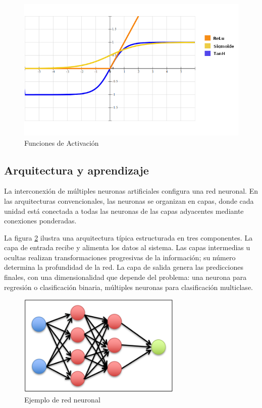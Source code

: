 \begin{figure}[h!]
    \centering
    \includegraphics[width=1\textwidth]{capitulos/img/funcion_activacion.png}
    \caption{Funciones de Activación}
    \label{fig:funcionesActivacion}
\end{figure}
%

\newpage
\subsection{Arquitectura y aprendizaje}
%

La interconexión de múltiples neuronas artificiales configura una red neuronal. En las arquitecturas convencionales, las neuronas se organizan en capas, donde cada unidad está conectada a todas las neuronas de las capas adyacentes mediante conexiones ponderadas.
%

La figura \ref{fig:redNeuronal} ilustra una arquitectura típica estructurada en tres componentes. La capa de entrada recibe y alimenta los datos al sistema. Las capas intermedias u ocultas realizan transformaciones progresivas de la información; su número determina la profundidad de la red. La capa de salida genera las predicciones finales, con una dimensionalidad que depende del problema: una neurona para regresión o clasificación binaria, múltiples neuronas para clasificación multiclase.
%

\begin{figure}[H]
    \centering
    \includegraphics{capitulos/img/redNeuronal.png}
    \caption{Ejemplo de red neuronal}
    \label{fig:redNeuronal}
\end{figure}
%

